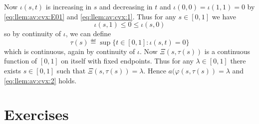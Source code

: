 \begin{thmproof}
Now \(\iota(s,t)\) is increasing in $s$ and decreasing in $t$
and
\(\iota(0,0) = \iota(1,1) = 0\)
by \eqref{eq:llem:av:cvx:E01} and \eqref{eq:llem:av:cvx:1}.
Thus for any \(s\in[0,1]\) we have
\begin{equation*}
\iota(s,1) \leq 0 \leq \iota(s,0)
\end{equation*}
so by continuity of \(\iota\), we can define
\begin{equation*}
\tau(s) \eqdef \sup\{t \in[0,1]: \iota(s,t) = 0\}
\end{equation*}
which is continuous, again by continuity of \(\iota\).
Now \(\Xi(s,\tau(s))\) is a continuous function of \([0,1]\) on itself
with fixed endpoints.
Thus for any \(\lambda\in[0,1]\)
there exists \(s\in[0,1]\) such that \(\Xi(s,\tau(s)) = \lambda\).
Hence \(a(\varphi(s,\tau(s)) = \lambda\) and \eqref{eq:llem:av:cvx:2} holds.
\end{thmproof}


\section{Exercises} %


